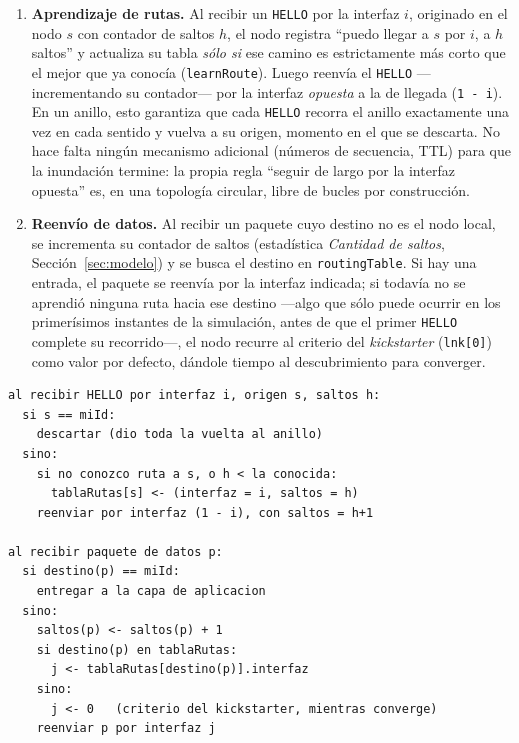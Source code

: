 \documentclass[10pt,letterpaper,twocolumn]{article}
\begin{document}
\begin{enumerate}
  \item \textbf{Aprendizaje de rutas.} Al recibir un \texttt{HELLO} por la
  interfaz $i$, originado en el nodo $s$ con contador de saltos $h$, el nodo
  registra ``puedo llegar a $s$ por $i$, a $h$ saltos'' y actualiza su tabla
  \emph{sólo si} ese camino es estrictamente más corto que el mejor que ya
  conocía (\texttt{learnRoute}). Luego reenvía el \texttt{HELLO}
  ---incrementando su contador--- por la interfaz \emph{opuesta} a la de
  llegada (\texttt{1 - i}). En un anillo, esto garantiza que cada \texttt{HELLO}
  recorra el anillo exactamente una vez en cada sentido y vuelva a su origen,
  momento en el que se descarta. No hace falta ningún mecanismo adicional
  (números de secuencia, TTL) para que la inundación termine: la propia regla
  ``seguir de largo por la interfaz opuesta'' es, en una topología circular,
  libre de bucles por construcción.
  \item \textbf{Reenvío de datos.} Al recibir un paquete cuyo destino no es el
  nodo local, se incrementa su contador de saltos (estadística \emph{Cantidad
  de saltos}, Sección~\ref{sec:modelo}) y se busca el destino en
  \texttt{routingTable}. Si hay una entrada, el paquete se reenvía por la
  interfaz indicada; si todavía no se aprendió ninguna ruta hacia ese destino
  ---algo que sólo puede ocurrir en los primerísimos instantes de la
  simulación, antes de que el primer \texttt{HELLO} complete su recorrido---,
  el nodo recurre al criterio del \emph{kickstarter} (\texttt{lnk[0]}) como
  valor por defecto, dándole tiempo al descubrimiento para converger.
\end{enumerate}

\begin{small}
\begin{verbatim}
al recibir HELLO por interfaz i, origen s, saltos h:
  si s == miId:
    descartar (dio toda la vuelta al anillo)
  sino:
    si no conozco ruta a s, o h < la conocida:
      tablaRutas[s] <- (interfaz = i, saltos = h)
    reenviar por interfaz (1 - i), con saltos = h+1

al recibir paquete de datos p:
  si destino(p) == miId:
    entregar a la capa de aplicacion
  sino:
    saltos(p) <- saltos(p) + 1
    si destino(p) en tablaRutas:
      j <- tablaRutas[destino(p)].interfaz
    sino:
      j <- 0   (criterio del kickstarter, mientras converge)
    reenviar p por interfaz j
\end{verbatim}
\end{small}
\end{document}
